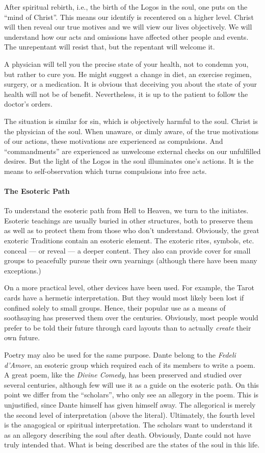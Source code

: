 After spiritual rebirth, i.e., the birth of the Logos in the soul, one puts on the “mind of Christ”. This means our
identify is recentered on a higher level. Christ will then reveal our true motives and we will view our lives
objectively. We will understand how our acts and omissions have affected other people and events. The unrepentant will
resist that, but the repentant will welcome it.

A physician will tell you the precise state of your health, not to condemn you, but rather to cure you. He might suggest
a change in diet, an exercise regimen, surgery, or a medication. It is obvious that deceiving you about the state of
your health will not be of benefit. Nevertheless, it is up to the patient to follow the doctor's orders.

The situation is similar for sin, which is objectively harmful to the soul. Christ is the physician of the soul. When
unaware, or dimly aware, of the true motivations of our actions, these motivations are experienced as compulsions. And
“commandments” are experienced as unwelcome external checks on our unfulfilled desires. But the light of the Logos in
the soul illuminates one's actions. It is the means to self-observation which turns compulsions into free
acts.

\paragraph{The Esoteric Path}
To understand the esoteric path from Hell to Heaven, we turn to the initiates. Esoteric teachings are usually buried in
other structures, both to preserve them as well as to protect them from those who don't understand.
Obviously, the great exoteric Traditions contain an esoteric element. The exoteric rites, symbols, etc. conceal
— or reveal — a deeper content. They also can provide cover for small groups to peacefully
pursue their own yearnings (although there have been many exceptions.)

On a more practical level, other devices have been used. For example, the Tarot cards have a hermetic interpretation.
But they would most likely been lost if confined solely to small groups. Hence, their popular use as a means of
soothsaying has preserved them over the centuries. Obviously, most people would prefer to be told their future through
card layouts than to actually \emph{create} their own future.

Poetry may also be used for the same purpose. Dante belong to the \emph{Fedeli d'Amore}, an esoteric group
which required each of its members to write a poem. A great poem, like the \emph{Divine Comedy}, has been preserved and
studied over several centuries, although few will use it as a guide on the esoteric path. On this point we differ from
the “scholars”, who only see an allegory in the poem. This is unjustified, since Dante himself has given himself away.
The allegorical is merely the second level of interpretation (above the literal). Ultimately, the fourth level is the
anagogical or spiritual interpretation. The scholars want to understand it as an allegory describing the soul after
death. Obviously, Dante could not have truly intended that. What is being described are the states of the soul in this
life.

